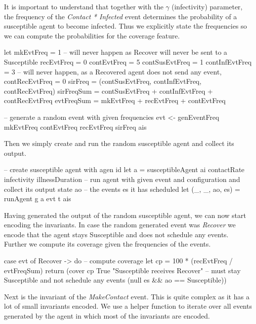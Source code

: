 It is important to understand that together with the $\gamma$ (infectivity) parameter, the frequency of the \textit{Contact * Infected} event determines the probability of a susceptible agent to become infected. Thus we explicitly state the frequencies so we can compute the probabilities for the coverage feature.

\begin{HaskellCode}
let mkEvtFreq = 1
    -- will never happen as Recover will never be sent to a Susceptible
    recEvtFreq = 0
    contEvtFreq = 5
    contSusEvtFreq = 1
    contInfEvtFreq = 3
    -- will never happen, as a Recovered agent does not send any event,
    contRecEvtFreq = 0
    sirFreq    = (contSusEvtFreq, contInfEvtFreq, contRecEvtFreq)
    sirFreqSum = contSusEvtFreq + contInfEvtFreq + contRecEvtFreq
    evtFreqSum = mkEvtFreq + recEvtFreq + contEvtFreq
    
-- generate a random event with given frequencies
evt <- genEventFreq mkEvtFreq contEvtFreq recEvtFreq sirFreq ais
\end{HaskellCode}

Then we simply create and run the random susceptible agent and collect its output.

\begin{HaskellCode}
-- create susceptible agent with agen id
let a = susceptibleAgent ai contactRate infectivity illnessDuration
-- run agent with given event and configuration and collect its output state ao
-- the events es it has scheduled
let (_, _, ao, es) = runAgent g a evt t ais
\end{HaskellCode}

Having generated the output of the random susceptible agent, we can now start encoding the invariants. In case the random generated event was \textit{Recover} we encode that the agent stays Susceptible and does not schedule any events. Further we compute its coverage given the frequencies of the events.

\begin{HaskellCode}
case evt of
  Recover -> do
    -- compute coverage
    let cp = 100 * (recEvtFreq / evtFreqSum)
    return (cover cp True "Susceptible receives Recover"
           -- must stay Susceptible and not schedule any events
           (null es && ao == Susceptible))
\end{HaskellCode}

Next is the invariant of the \textit{MakeContact} event. This is quite complex as it has a lot of small invariants encoded. We use a helper function to iterate over all events generated by the agent in which most of the invariants are encoded.

